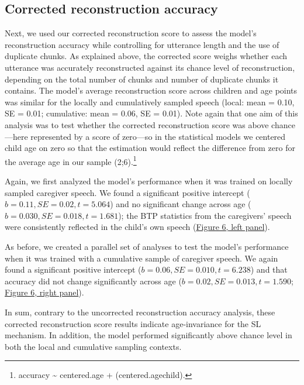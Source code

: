 \documentclass[
  english,
  man,mask,floatsintext]{apa6}
\begin{document}
\hypertarget{corrected-reconstruction-accuracy-1}{%
\subsection{Corrected reconstruction accuracy}\label{corrected-reconstruction-accuracy-1}}

Next, we used our corrected reconstruction score to assess the model's reconstruction accuracy while controlling for utterance length and the use of duplicate chunks. As explained above, the corrected score weighs whether each utterance was accurately reconstructed against its chance level of reconstruction, depending on the total number of chunks and number of duplicate chunks it contains. The model's average reconstruction score across children and age points was similar for the locally and cumulatively sampled speech (local: mean = 0.10, SE = 0.01; cumulative: mean = 0.06, SE = 0.01). Note again that one aim of this analysis was to test whether the corrected reconstruction score was above chance---here represented by a score of zero---so in the statistical models we centered child age on zero so that the estimation would reflect the difference from zero for the average age in our sample (2;6).\footnote{accuracy \textasciitilde{} centered.age + (centered.age\textbar child).}

Again, we first analyzed the model's performance when it was trained on locally sampled caregiver speech. We found a significant positive intercept (\(b = 0.11, SE = 0.02, t = 5.064\)) and no significant change across age (\(b = 0.030, SE = 0.018, t = 1.681\)); the BTP statistics from the caregivers' speech were consistently reflected in the child's own speech (\protect\hyperlink{fig6}{Figure 6, left panel}).

As before, we created a parallel set of analyses to test the model's performance when it was trained with a cumulative sample of caregiver speech. We again found a significant positive intercept (\(b= 0.06, SE = 0.010, t = 6.238\)) and that accuracy did not change significantly across age (\(b=0.02, SE = 0.013, t = 1.590\); \protect\hyperlink{fig6}{Figure 6, right panel}).

In sum, contrary to the uncorrected reconstruction accuracy analysis, these corrected reconstruction score results indicate age-invariance for the SL mechanism. In addition, the model performed significantly above chance level in both the local and cumulative sampling contexts.
\end{document}
